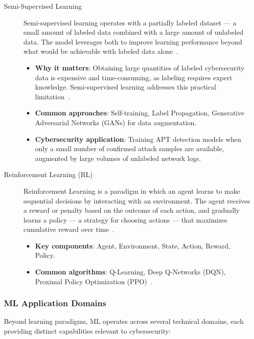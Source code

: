 \begin{description}
    \item[Semi-Supervised Learning] Semi-supervised learning operates with a partially labeled dataset --- a small amount of labeled data combined with a large amount of unlabeled data. The model leverages both to improve learning performance beyond what would be achievable with labeled data alone~\cite{zhu2005semisupervised}.
    \begin{itemize}
        \item \textbf{Why it matters}: Obtaining large quantities of labeled cybersecurity data is expensive and time-consuming, as labeling requires expert knowledge. Semi-supervised learning addresses this practical limitation~\cite{zhu2005semisupervised}.
        \item \textbf{Common approaches}: Self-training, Label Propagation, Generative Adversarial Networks (GANs) for data augmentation.
        \item \textbf{Cybersecurity application}: Training APT detection models when only a small number of confirmed attack samples are available, augmented by large volumes of unlabeled network logs.
    \end{itemize}
    

    \item[Reinforcement Learning (RL)] Reinforcement Learning is a paradigm in which an agent learns to make sequential decisions by interacting with an environment. The agent receives a reward or penalty based on the outcome of each action, and gradually learns a policy --- a strategy for choosing actions --- that maximizes cumulative reward over time~\cite{sutton2018reinforcement}.
    \begin{itemize}
        \item \textbf{Key components}: Agent, Environment, State, Action, Reward, Policy.
        \item \textbf{Common algorithms}: Q-Learning, Deep Q-Networks (DQN), Proximal Policy Optimization (PPO)~\cite{sutton2018reinforcement}.
    \end{itemize}
    
\end{description}

\subsubsection*{ML Application Domains}

Beyond learning paradigms, ML operates across several technical domains, each providing distinct capabilities relevant to cybersecurity:

